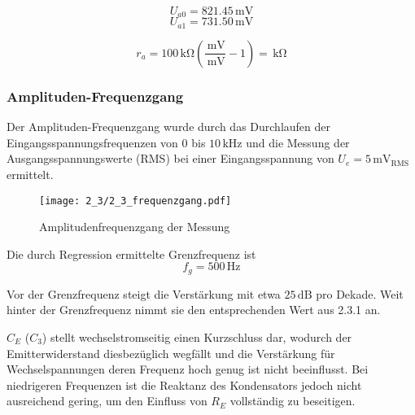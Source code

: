 \[U_{a0} = 821.45 \, \si{\milli\volt}\]
\[U_{a1} = 731.50 \, \si{\milli\volt}\]

\[r_a = 100 \, \si{\kilo\ohm} \left( \frac{ \, \si{\milli\volt}}{\,
      \si{\milli\volt}} -1 \right) = \, \si{\kilo\ohm}\]


\subsubsection{Amplituden-Frequenzgang}
Der Amplituden-Frequenzgang wurde durch das Durchlaufen der
Eingangsspannungsfrequenzen von $0$ bis $10 \, \si{\kilo\hertz}$ und die Messung
der Ausgangsspannungswerte (RMS) bei einer Eingangsspannung von $U_e =
5\,\si{\milli\volt}_{\mathrm{RMS}}$ ermittelt.

\begin{figure}[H]
  \begin{center}
    \texttt{[image: 2\_3/2\_3\_frequenzgang.pdf]}
  \end{center}
  \caption{Amplitudenfrequenzgang der Messung}
\end{figure}

Die durch Regression ermittelte Grenzfrequenz ist
\[f_g = 500 \, \si{\hertz}\]

Vor der Grenzfrequenz steigt die Verstärkung mit etwa $25 \, \si{\deci\bel}$ pro
Dekade. Weit hinter der Grenzfrequenz nimmt sie den entsprechenden Wert aus
2.3.1 an.

$C_E$ ($C_3$) stellt wechselstromseitig einen Kurzschluss dar, wodurch der
Emitterwiderstand diesbezüglich wegfällt und die Verstärkung für 
Wechselspannungen deren Frequenz hoch genug ist nicht beeinflusst. Bei
niedrigeren Frequenzen ist die Reaktanz des Kondensators jedoch nicht
ausreichend gering, um den Einfluss von $R_E$ vollständig zu beseitigen.